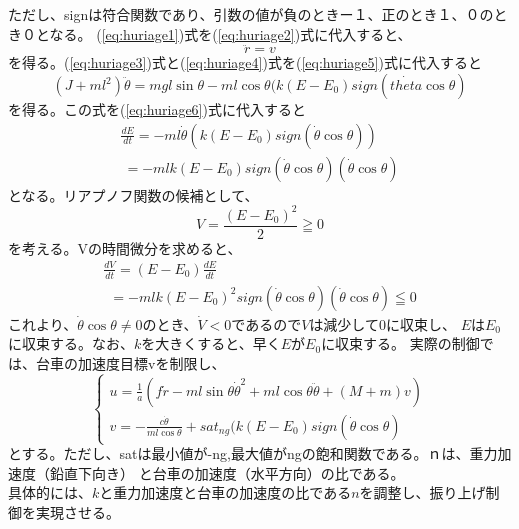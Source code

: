 	ただし、signは符合関数であり、引数の値が負のときー１、正のとき１、０のとき０となる。
	(\ref{eq:huriage1})式を(\ref{eq:huriage2})式に代入すると、
	\begin{equation}
		\ddot{r} = v
		\label{eq:huriage3}
	\end{equation}
	を得る。(\ref{eq:huriage3})式と(\ref{eq:huriage4})式を(\ref{eq:huriage5})式に代入すると
	\begin{equation}
		(J+ml^{2})\ddot{\theta} = mgl\sin{\theta}-ml\cos{\theta}(k(E-E_{0})sign(\dot{theta}\cos{\theta})
	\end{equation}
	を得る。この式を(\ref{eq:huriage6})式に代入すると
	\begin{equation}
		\begin{array}{l}
			\frac{dE}{dt} = -ml\dot{\theta}(k(E-E_{0})sign(\dot{\theta}\cos{\theta}))\\
			\ = -mlk(E-E_{0})sign(\dot{\theta}\cos{\theta})(\dot{\theta}\cos{\theta})
		\end{array}
	\end{equation}
	となる。リアプノフ関数の候補として、
	\begin{equation}
		V = \frac{(E-E_{0})^{2}}{2}≧0
	\end{equation}
	を考える。Vの時間微分を求めると、
	\begin{equation}
		\begin{array}{l}
			\frac{dV}{dt} = (E - E_{0})\frac{dE}{dt}\\
			\ \ = -mlk(E-E_{0})^{2}sign(\dot{\theta}\cos{\theta})(\dot{\theta}\cos{\theta})≦0
		\end{array}
	\end{equation}
	これより、$\dot{\theta}\cos{\theta}≠0$のとき、$\dot{V}<0$であるので$V$は減少して$0$に収束し、
	$E$は$E_0$に収束する。なお、$k$を大きくすると、早く$E$が$E_0$に収束する。
	実際の制御では、台車の加速度目標vを制限し、
	\begin{equation}
		\left\{
		\begin{array}{l}
			u = \frac{1}{a}\left(f\dot{r} - ml\sin{\theta}\dot{\theta}^2 + ml\cos{\theta}\ddot{\theta}+(M+m)v \right)\\
			v = -\frac{c\dot{\theta}}{ml\cos{\theta}}+sat_{ng}(k(E-E_{0})sign(\dot{\theta}\cos{\theta})
		\end{array}
		\right.
	\end{equation}
	とする。ただし、satは最小値が-ng,最大値がngの飽和関数である。ｎは、重力加速度（鉛直下向き）
	と台車の加速度（水平方向）の比である。\\
	具体的には、$k$と重力加速度と台車の加速度の比である$n$を調整し、振り上げ制御を実現させる。

